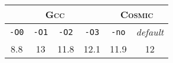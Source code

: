 
\begin{tabular}{|c|c|c|c||c|c|}
   \hline
    \multicolumn{4}{|c||}{\textsc{Gcc}} & \multicolumn{2}{c|}{\textsc{Cosmic}} 
    
    \\\hline

    \verb|-O0| & \verb|-O1| &\verb|-O2| &\verb|-O3| & \verb|-no| & \emph{default}

    \\\hline

    8.8 & 13 & 11.8 & 12.1 & 11.9 & 12
  
     \\\hline
\end{tabular}
